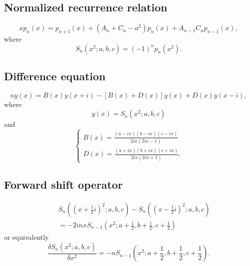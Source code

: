 \documentclass[envcountchap,graybox]{svmono}
\begin{document}
\subsection*{Normalized recurrence relation}
\begin{equation}
\label{NormRecContDualHahn}
xp_n(x)=p_{n+1}(x)+(A_n+C_n-a^2)p_n(x)+A_{n-1}C_np_{n-1}(x),
\end{equation}
where
$$S_n(x^2;a,b,c)=(-1)^np_n(x^2).$$

\subsection*{Difference equation}
\begin{equation}
\label{dvContDualHahn}
ny(x)=B(x)y(x+i)-\left[B(x)+D(x)\right]y(x)+D(x)y(x-i),
\end{equation}
where
$$y(x)=S_n(x^2;a,b,c)$$
and
$$\left\{\begin{array}{l}
\displaystyle B(x)=\frac{(a-ix)(b-ix)(c-ix)}{2ix(2ix-1)}\\[5mm]
\displaystyle D(x)=\frac{(a+ix)(b+ix)(c+ix)}{2ix(2ix+1)}.
\end{array}\right.$$

\subsection*{Forward shift operator}
\begin{eqnarray}
\label{shift1ContDualHahnI}
& &S_n((x+\textstyle\frac{1}{2}i)^2;a,b,c)-S_n((x-\textstyle\frac{1}{2}i)^2;a,b,c)\nonumber\\
& &{}=-2inxS_{n-1}(x^2;a+\textstyle\frac{1}{2},b+\textstyle\frac{1}{2},c+\textstyle\frac{1}{2})
\end{eqnarray}
or equivalently
\begin{equation}
\label{shift1ContDualHahnII}
\frac{\delta S_n(x^2;a,b,c)}{\delta x^2}=-nS_{n-1}(x^2;a+\textstyle\frac{1}{2},
b+\textstyle\frac{1}{2},c+\textstyle\frac{1}{2}).
\end{equation}
\end{document}
